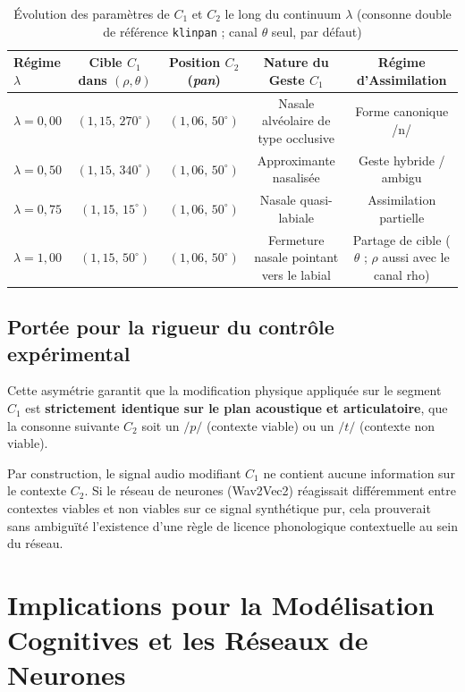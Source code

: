 \documentclass[11pt,a4paper]{article}
\begin{document}
\begin{table}[h]
\centering
\caption{Évolution des paramètres de $C_1$ et $C_2$ le long du continuum $\lambda$ (consonne double de référence \texttt{klinpan} ; canal $\theta$ seul, par défaut)}
\vspace{0.2cm}
\small
\begin{tabular}{lcccc}
\toprule
\textbf{Régime $\lambda$} & \textbf{Cible $C_1$ dans $(\rho, \theta)$} & \textbf{Position $C_2$ (\textit{pan})} & \textbf{Nature du Geste $C_1$} & \textbf{Régime d'Assimilation} \\
\midrule
$\lambda = 0{,}00$ & $(1{,}15,\, 270^\circ)$ & $(1{,}06,\, 50^\circ)$ & Nasale alvéolaire de type occlusive & Forme canonique /n/ \\
$\lambda = 0{,}50$ & $(1{,}15,\, 340^\circ)$ & $(1{,}06,\, 50^\circ)$ & Approximante nasalisée & Geste hybride / ambigu \\
$\lambda = 0{,}75$ & $(1{,}15,\, 15^\circ)$ & $(1{,}06,\, 50^\circ)$ & Nasale quasi-labiale & Assimilation partielle \\
$\lambda = 1{,}00$ & $(1{,}15,\, 50^\circ)$ & $(1{,}06,\, 50^\circ)$ & Fermeture nasale pointant vers le labial & Partage de cible ($\theta$ ; $\rho$ aussi avec le canal rho) \\
\bottomrule
\end{tabular}
\end{table}

\subsection{Portée pour la rigueur du contrôle expérimental}
Cette asymétrie garantit que la modification physique appliquée sur le segment $C_1$ est \textbf{strictement identique sur le plan acoustique et articulatoire}, que la consonne suivante $C_2$ soit un $/p/$ (contexte viable) ou un $/t/$ (contexte non viable).

\begin{keyinsight}
Par construction, le signal audio modifiant $C_1$ ne contient aucune information sur le contexte $C_2$. Si le réseau de neurones (Wav2Vec2) réagissait différemment entre contextes viables et non viables sur ce signal synthétique pur, cela prouverait sans ambiguïté l'existence d'une règle de licence phonologique contextuelle au sein du réseau.
\end{keyinsight}

\section{Implications pour la Modélisation Cognitives et les Réseaux de Neurones}
\end{document}
